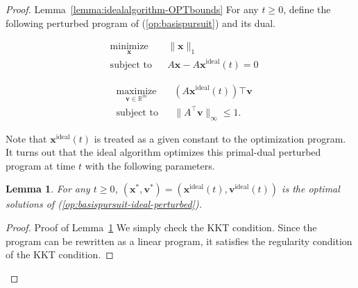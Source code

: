 \documentclass[11pt]{article}
\newtheorem{lemma}{Lemma}[section]
\theoremstyle{remark}
\theoremstyle{definition}
\newcommand{\bx}{\mathbf{x}}
\newcommand{\bv}{\mathbf{v}}
\newcommand{\R}{{\mathbb R}} %
\begin{document}
\begin{proof}{Lemma~\ref{lemma:idealalgorithm-OPTbounds}}
	For any $t\geq0$, define the following perturbed program of (\ref{op:basispursuit}) and its dual.
	\vspace{3mm}
	\begin{minipage}{\linewidth}
		\begin{minipage}{0.45\linewidth}
			\begin{equation}\label{op:basispursuit-ideal-perturbed}
			\begin{aligned}
			& \underset{\bx}{\text{minimize}}
			& & \|\bx\|_1 \\
			& \text{subject to}
			& & A\bx-A\bx^{\text{ideal}}(t)=0
			\end{aligned}
			\end{equation}
		\end{minipage}
		\begin{minipage}{0.45\linewidth}
			\begin{equation}\label{op:basispursuit-ideal-perturbed-dual}
			\begin{aligned}
			& \underset{\bv\in\R^m}{\text{maximize}}
			& & (A\bx^{\text{ideal}}(t))\top\bv \\
			& \text{subject to}
			& & \|A^\top\bv\|_{\infty}\leq1.
			\end{aligned}
			\end{equation}
		\end{minipage}
	\end{minipage}
	
	Note that $\bx^{\text{ideal}}(t)$ is treated as a given constant to the optimization program. It turns out that the ideal algorithm optimizes this primal-dual perturbed program at time $t$ with the following parameters.
	\begin{lemma}\label{lemma:proofofidealalgorithm-KKT}
		For any $t\geq0$, $(\bx^*,\bv^*) = (\bx^{\text{ideal}}(t),\bv^{\text{ideal}}(t))$ is the optimal solutions of (\ref{op:basispursuit-ideal-perturbed}).
	\end{lemma}
	\begin{proof}{Proof of Lemma~\ref{lemma:proofofidealalgorithm-KKT}}
		We simply check the KKT condition. Since the program can be rewritten as a linear program, it satisfies the regularity condition of the KKT condition.
		

\end{proof}
\end{proof}
\end{document}
